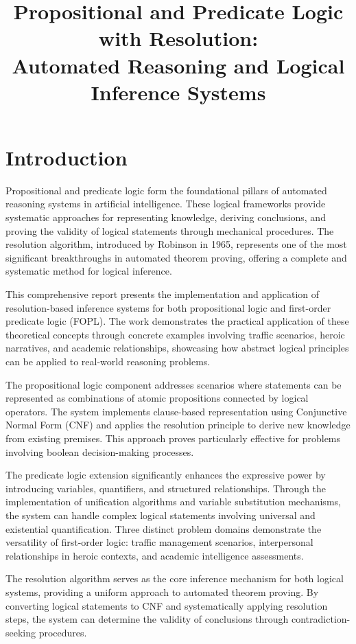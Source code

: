 \documentclass[11pt,a4paper]{article}
\title{Propositional and Predicate Logic with Resolution: \\ Automated Reasoning and Logical Inference Systems}
\author{}
\date{}
\begin{document}
\maketitle

\section{Introduction}

Propositional and predicate logic form the foundational pillars of automated reasoning systems in artificial intelligence. These logical frameworks provide systematic approaches for representing knowledge, deriving conclusions, and proving the validity of logical statements through mechanical procedures. The resolution algorithm, introduced by Robinson in 1965, represents one of the most significant breakthroughs in automated theorem proving, offering a complete and systematic method for logical inference.

This comprehensive report presents the implementation and application of resolution-based inference systems for both propositional logic and first-order predicate logic (FOPL). The work demonstrates the practical application of these theoretical concepts through concrete examples involving traffic scenarios, heroic narratives, and academic relationships, showcasing how abstract logical principles can be applied to real-world reasoning problems.

The propositional logic component addresses scenarios where statements can be represented as combinations of atomic propositions connected by logical operators. The system implements clause-based representation using Conjunctive Normal Form (CNF) and applies the resolution principle to derive new knowledge from existing premises. This approach proves particularly effective for problems involving boolean decision-making processes.

The predicate logic extension significantly enhances the expressive power by introducing variables, quantifiers, and structured relationships. Through the implementation of unification algorithms and variable substitution mechanisms, the system can handle complex logical statements involving universal and existential quantification. Three distinct problem domains demonstrate the versatility of first-order logic: traffic management scenarios, interpersonal relationships in heroic contexts, and academic intelligence assessments.

The resolution algorithm serves as the core inference mechanism for both logical systems, providing a uniform approach to automated theorem proving. By converting logical statements to CNF and systematically applying resolution steps, the system can determine the validity of conclusions through contradiction-seeking procedures.
\end{document}
